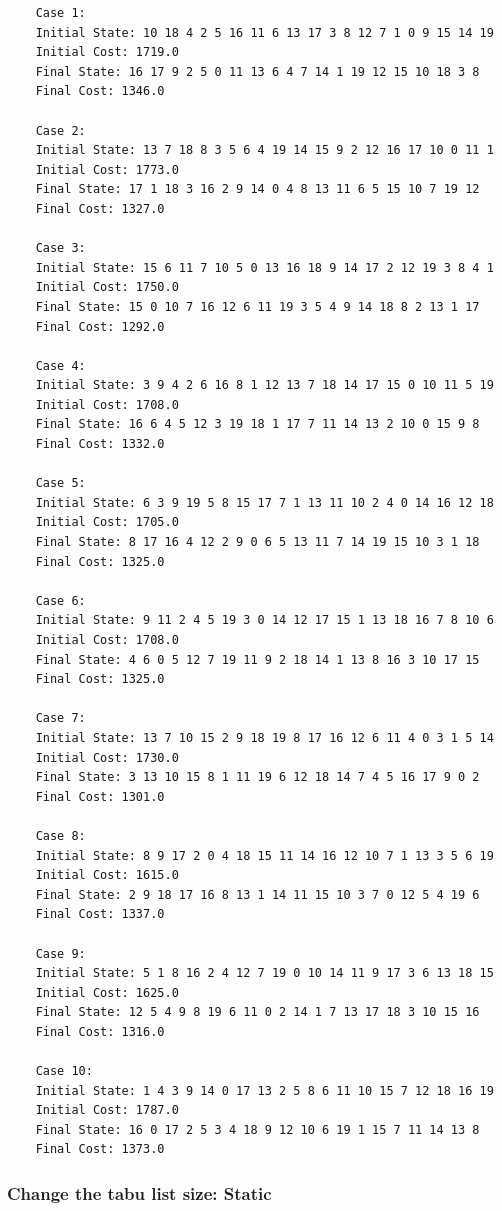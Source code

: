 \documentclass{article}
\begin{document}
\begin{lstlisting}
    Case 1:
    Initial State: 10 18 4 2 5 16 11 6 13 17 3 8 12 7 1 0 9 15 14 19
    Initial Cost: 1719.0
    Final State: 16 17 9 2 5 0 11 13 6 4 7 14 1 19 12 15 10 18 3 8
    Final Cost: 1346.0
    
    Case 2:
    Initial State: 13 7 18 8 3 5 6 4 19 14 15 9 2 12 16 17 10 0 11 1
    Initial Cost: 1773.0
    Final State: 17 1 18 3 16 2 9 14 0 4 8 13 11 6 5 15 10 7 19 12
    Final Cost: 1327.0
    
    Case 3:
    Initial State: 15 6 11 7 10 5 0 13 16 18 9 14 17 2 12 19 3 8 4 1
    Initial Cost: 1750.0
    Final State: 15 0 10 7 16 12 6 11 19 3 5 4 9 14 18 8 2 13 1 17
    Final Cost: 1292.0
    
    Case 4:
    Initial State: 3 9 4 2 6 16 8 1 12 13 7 18 14 17 15 0 10 11 5 19
    Initial Cost: 1708.0
    Final State: 16 6 4 5 12 3 19 18 1 17 7 11 14 13 2 10 0 15 9 8
    Final Cost: 1332.0
    
    Case 5:
    Initial State: 6 3 9 19 5 8 15 17 7 1 13 11 10 2 4 0 14 16 12 18
    Initial Cost: 1705.0
    Final State: 8 17 16 4 12 2 9 0 6 5 13 11 7 14 19 15 10 3 1 18
    Final Cost: 1325.0
    
    Case 6:
    Initial State: 9 11 2 4 5 19 3 0 14 12 17 15 1 13 18 16 7 8 10 6
    Initial Cost: 1708.0
    Final State: 4 6 0 5 12 7 19 11 9 2 18 14 1 13 8 16 3 10 17 15
    Final Cost: 1325.0
    
    Case 7:
    Initial State: 13 7 10 15 2 9 18 19 8 17 16 12 6 11 4 0 3 1 5 14
    Initial Cost: 1730.0
    Final State: 3 13 10 15 8 1 11 19 6 12 18 14 7 4 5 16 17 9 0 2
    Final Cost: 1301.0
    
    Case 8:
    Initial State: 8 9 17 2 0 4 18 15 11 14 16 12 10 7 1 13 3 5 6 19
    Initial Cost: 1615.0
    Final State: 2 9 18 17 16 8 13 1 14 11 15 10 3 7 0 12 5 4 19 6
    Final Cost: 1337.0
    
    Case 9:
    Initial State: 5 1 8 16 2 4 12 7 19 0 10 14 11 9 17 3 6 13 18 15
    Initial Cost: 1625.0
    Final State: 12 5 4 9 8 19 6 11 0 2 14 1 7 13 17 18 3 10 15 16
    Final Cost: 1316.0
    
    Case 10:
    Initial State: 1 4 3 9 14 0 17 13 2 5 8 6 11 10 15 7 12 18 16 19
    Initial Cost: 1787.0
    Final State: 16 0 17 2 5 3 4 18 9 12 10 6 19 1 15 7 11 14 13 8
    Final Cost: 1373.0
\end{lstlisting}

\subsubsection{Change the tabu list size: Static}
\end{document}
